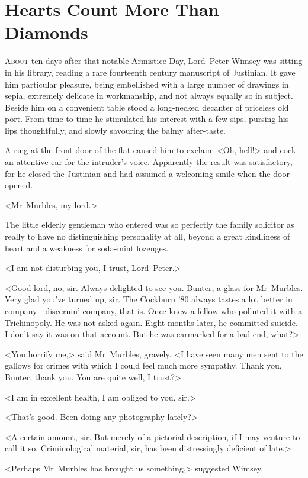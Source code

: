 \chapter{Hearts Count More Than Diamonds}
\lettrine{A}{bout} ten days after that notable Armistice Day, Lord~Peter Wimsey was sitting in his library, reading a rare fourteenth century manuscript of Justinian. It gave him particular pleasure, being embellished with a large number of drawings in sepia, extremely delicate in workmanship, and not always equally so in subject. Beside him on a convenient table stood a long-necked decanter of priceless old port. From time to time he stimulated his interest with a few sips, pursing his lips thoughtfully, and slowly savouring the balmy after-taste.

A ring at the front door of the flat caused him to exclaim <Oh, hell!> and cock an attentive ear for the intruder's voice. Apparently the result was satisfactory, for he closed the Justinian and had assumed a welcoming smile when the door opened.

<Mr~Murbles, my lord.>

The little elderly gentleman who entered was so perfectly the family solicitor as really to have no distinguishing personality at all, beyond a great kindliness of heart and a weakness for soda-mint lozenges.

<I am not disturbing you, I trust, Lord~Peter.>

<Good lord, no, sir. Always delighted to see you. Bunter, a glass for Mr~Mur\-bles. Very glad you've turned up, sir. The Cockburn '80 always tastes a lot better in company—discernin' company, that is. Once knew a fellow who polluted it with a Trichinopoly. He was not asked again. Eight months later, he committed suicide. I don't say it was on that account. But he was earmarked for a bad end, what?>

<You horrify me,> said Mr~Murbles, gravely. <I have seen many men sent to the gallows for crimes with which I could feel much more sympathy. Thank you, Bunter, thank you. You are quite well, I trust?>

<I am in excellent health, I am obliged to you, sir.>

<That's good. Been doing any photography lately?>

<A certain amount, sir. But merely of a pictorial description, if I may venture to call it so. Criminological material, sir, has been distressingly deficient of late.>

<Perhaps Mr~Murbles has brought us something,> suggested Wimsey.

